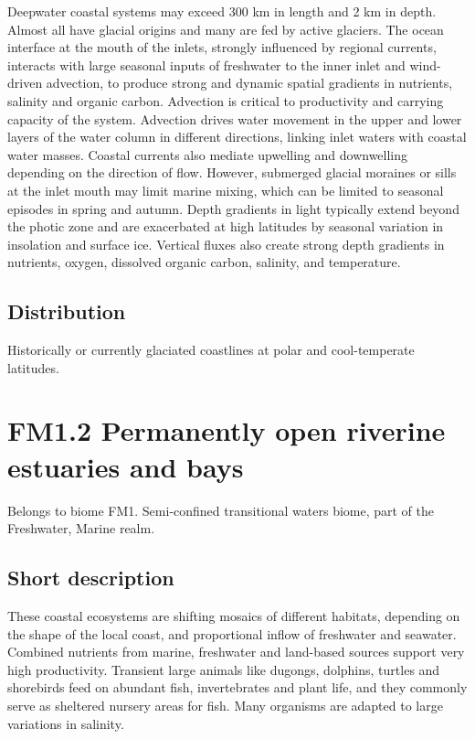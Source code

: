 \documentclass[
  letterpaper,
  DIV=11,
  numbers=noendperiod]{scrartcl}
\begin{document}
Deepwater coastal systems may exceed 300 km in length and 2 km in depth.
Almost all have glacial origins and many are fed by active glaciers. The
ocean interface at the mouth of the inlets, strongly influenced by
regional currents, interacts with large seasonal inputs of freshwater to
the inner inlet and wind-driven advection, to produce strong and dynamic
spatial gradients in nutrients, salinity and organic carbon. Advection
is critical to productivity and carrying capacity of the system.
Advection drives water movement in the upper and lower layers of the
water column in different directions, linking inlet waters with coastal
water masses. Coastal currents also mediate upwelling and downwelling
depending on the direction of flow. However, submerged glacial moraines
or sills at the inlet mouth may limit marine mixing, which can be
limited to seasonal episodes in spring and autumn. Depth gradients in
light typically extend beyond the photic zone and are exacerbated at
high latitudes by seasonal variation in insolation and surface ice.
Vertical fluxes also create strong depth gradients in nutrients, oxygen,
dissolved organic carbon, salinity, and temperature.

\subsection{Distribution}\label{distribution-22}

Historically or currently glaciated coastlines at polar and
cool-temperate latitudes.

\section{FM1.2 Permanently open riverine estuaries and
bays}\label{fm1.2-permanently-open-riverine-estuaries-and-bays}

Belongs to biome FM1. Semi-confined transitional waters biome, part of
the Freshwater, Marine realm.

\subsection{Short description}\label{short-description-23}

These coastal ecosystems are shifting mosaics of different habitats,
depending on the shape of the local coast, and proportional inflow of
freshwater and seawater. Combined nutrients from marine, freshwater and
land-based sources support very high productivity. Transient large
animals like dugongs, dolphins, turtles and shorebirds feed on abundant
fish, invertebrates and plant life, and they commonly serve as sheltered
nursery areas for fish. Many organisms are adapted to large variations
in salinity.
\end{document}
